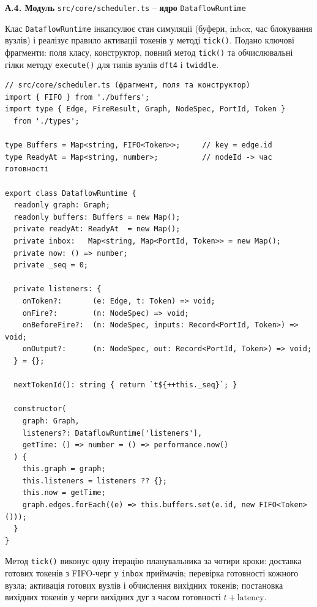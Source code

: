 \documentclass[
]{article}
\begin{document}
\textbf{А.4. Модуль} \texttt{src/core/scheduler.ts} -- \textbf{ядро}
\texttt{DataflowRuntime}

Клас \texttt{DataflowRuntime} інкапсулює стан симуляції (буфери, inbox,
час блокування вузлів) і реалізує правило активації токенів у методі
\texttt{tick()}. Подано ключові фрагменти: поля класу, конструктор,
повний метод \texttt{tick()} та обчислювальні гілки методу
\texttt{execute()} для типів вузлів \texttt{dft4} і \texttt{twiddle}.

\begin{verbatim}
// src/core/scheduler.ts (фрагмент, поля та конструктор)
import { FIFO } from './buffers';
import type { Edge, FireResult, Graph, NodeSpec, PortId, Token }
  from './types';

type Buffers = Map<string, FIFO<Token>>;     // key = edge.id
type ReadyAt = Map<string, number>;          // nodeId -> час готовності

export class DataflowRuntime {
  readonly graph: Graph;
  readonly buffers: Buffers = new Map();
  private readyAt: ReadyAt  = new Map();
  private inbox:   Map<string, Map<PortId, Token>> = new Map();
  private now: () => number;
  private _seq = 0;

  private listeners: {
    onToken?:       (e: Edge, t: Token) => void;
    onFire?:        (n: NodeSpec) => void;
    onBeforeFire?:  (n: NodeSpec, inputs: Record<PortId, Token>) => void;
    onOutput?:      (n: NodeSpec, out: Record<PortId, Token>) => void;
  } = {};

  nextTokenId(): string { return `t${++this._seq}`; }

  constructor(
    graph: Graph,
    listeners?: DataflowRuntime['listeners'],
    getTime: () => number = () => performance.now()
  ) {
    this.graph = graph;
    this.listeners = listeners ?? {};
    this.now = getTime;
    graph.edges.forEach((e) => this.buffers.set(e.id, new FIFO<Token>()));
  }
}
\end{verbatim}

Метод \texttt{tick()} виконує одну ітерацію планувальника за чотири
кроки: доставка готових токенів з FIFO-черг у \texttt{inbox} приймачів;
перевірка готовності кожного вузла; активація готових вузлів і
обчислення вихідних токенів; постановка вихідних токенів у черги
вихідних дуг з часом готовності \(t + \text{latency}\).
\end{document}
